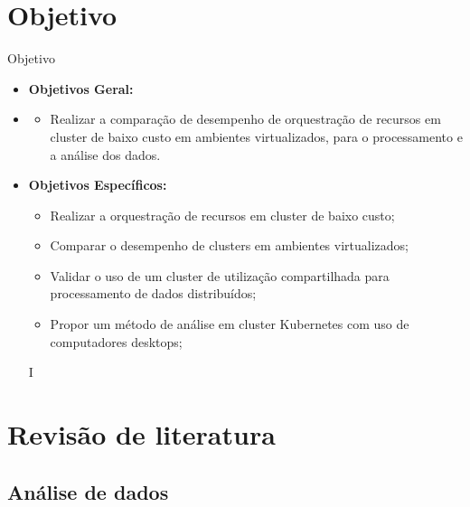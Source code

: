 \documentclass[10pt,brazil]{beamer}
\theoremstyle{definition}
\begin{document}
\section{Objetivo}
\begin{frame}{Objetivo}
  \begin{itemize}
    \item[] \textbf{Objetivos Geral:}
    \item[]
          \begin{itemize}
            \item[] Realizar a comparação de desempenho de orquestração de recursos em cluster de baixo custo em ambientes virtualizados, para o processamento e a análise dos dados.
          \end{itemize}
    \item[] \textbf{Objetivos Específicos:}
          \begin{itemize}
            \item Realizar a orquestração de recursos em cluster de baixo custo;
            \item Comparar o desempenho de clusters em ambientes virtualizados;
            \item Validar o uso de um cluster de utilização compartilhada para processamento de dados distribuídos;
            \item Propor um método de análise em cluster Kubernetes com uso de computadores desktops;
          \end{itemize}
          I\end{itemize}
\end{frame}


\section{Revisão de literatura}

\subsection{Análise de dados}
\end{document}
